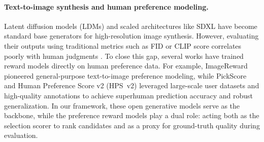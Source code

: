 \documentclass[twocolumn,11pt]{article}
\theoremstyle{plain}
\theoremstyle{definition}
\theoremstyle{remark}
\begin{document}
\paragraph{Text-to-image synthesis and human preference modeling.}
Latent diffusion models (LDMs) \citep{rombach2022high,zhang2023adding,ruiz2023dreambooth} and scaled architectures like SDXL \citep{podell2023sdxl} have become standard base generators for high-resolution image synthesis. However, evaluating their outputs using traditional metrics such as FID or CLIP score correlates poorly with human judgments \citep{jayasumana2024rethinking}. To close this gap, several works have trained reward models directly on human preference data. For example, ImageReward \citep{xu2023imagereward} pioneered general-purpose text-to-image preference modeling, while PickScore \citep{kirstain2023pick} and Human Preference Score v2 (HPS~v2) \citep{wu2023human} leveraged large-scale user datasets and high-quality annotations to achieve superhuman prediction accuracy and robust generalization. In our framework, these open generative models serve as the backbone, while the preference reward models play a dual role: acting both as the selection scorer to rank candidates and as a proxy for ground-truth quality during evaluation.

\end{document}
